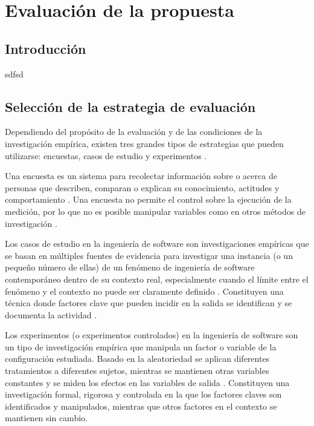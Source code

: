 \chapter{\large Evaluación de la propuesta}\label{Capítulo 3}

\pagestyle{fancy}
\lhead{}
\chead{}
\lfoot{}
\cfoot{}
\rfoot{\thepage}
\renewcommand{\headrulewidth}{0.4pt}
\vspace{-1cm}

\section{Introducción}
sdfsd

\section{Selección de la estrategia de evaluación}
Dependiendo del propósito de la evaluación y de las condiciones de la investigación empírica, existen tres grandes tipos de estrategias que pueden utilizarse: encuestas, casos de estudio y experimentos \citep{Wohlin2012}.

Una encuesta es un sistema para recolectar información sobre o acerca de personas que describen, comparan o explican su conocimiento, actitudes y comportamiento \citep{Wohlin2012}. Una encuesta no permite el control sobre la ejecución de la medición, por lo que no es posible manipular variables como en otros métodos de investigación \citep{Wohlin2012}.

Los casos de estudio en la ingeniería de software son investigaciones empíricas que se basan en múltiples fuentes de evidencia para investigar una instancia (o un pequeño número de ellas) de un fenómeno de ingeniería de software contemporáneo dentro de su contexto real, especialmente cuando el límite entre el fenómeno y el contexto no puede ser claramente definido \citep{Runeson:2012:CSR:2361717,Wohlin2012}. Constituyen una técnica donde factores clave que pueden incidir en la salida se identifican y se documenta la actividad \citep{stake1995art}. 

Los experimentos (o experimentos controlados) en la ingeniería de software son un tipo de investigación empírica que manipula un factor o variable de la configuración estudiada. Basado en la aleatoriedad se aplican diferentes tratamientos a diferentes sujetos, mientras se mantienen otras variables constantes y se miden los efectos en las variables de salida \citep{Wohlin2012}. Constituyen una investigación formal, rigorosa y controlada en la que los factores claves son identificados y manipulados, mientras que otros factores en el contexto se mantienen sin cambio. 


